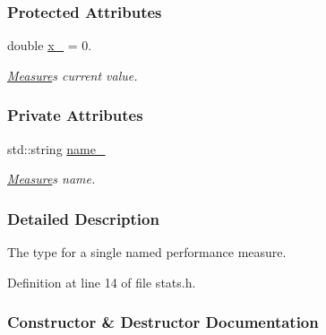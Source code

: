\subsubsection*{Protected Attributes}
\begin{DoxyCompactItemize}
\item 
double \hyperlink{structslb_1_1core_1_1sb_1_1Measure_a4795d269bcbc67fa16adca7d546b16ec}{x\+\_\+} = 0.\hypertarget{structslb_1_1core_1_1sb_1_1Measure_a4795d269bcbc67fa16adca7d546b16ec}{}\label{structslb_1_1core_1_1sb_1_1Measure_a4795d269bcbc67fa16adca7d546b16ec}

\begin{DoxyCompactList}\small\item\em \hyperlink{structslb_1_1core_1_1sb_1_1Measure}{Measure}\textquotesingle{}s current value. \end{DoxyCompactList}\end{DoxyCompactItemize}
\subsubsection*{Private Attributes}
\begin{DoxyCompactItemize}
\item 
std\+::string \hyperlink{structslb_1_1core_1_1sb_1_1Measure_a1cf09241f98264f924aed2b54468e4f3}{name\+\_\+}\hypertarget{structslb_1_1core_1_1sb_1_1Measure_a1cf09241f98264f924aed2b54468e4f3}{}\label{structslb_1_1core_1_1sb_1_1Measure_a1cf09241f98264f924aed2b54468e4f3}

\begin{DoxyCompactList}\small\item\em \hyperlink{structslb_1_1core_1_1sb_1_1Measure}{Measure}\textquotesingle{}s name. \end{DoxyCompactList}\end{DoxyCompactItemize}


\subsubsection{Detailed Description}
The type for a single named performance measure. 

Definition at line 14 of file stats.\+h.



\subsubsection{Constructor \& Destructor Documentation}
